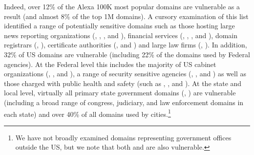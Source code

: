 Indeed, over 12\% of the Alexa 100K
most popular domains are vulnerable as a result (and almost 8\% of the
top 1M domains).  A cursory examination of this list identified a
range of potentially sensitive domains such as those hosting large
news reporting organizations (\eg, ,
,
and ),
financial services (\eg,
, ,
and ),
domain registrars (\eg, ),
certificate authorities (\eg,
 and ) and large law firms (\eg,
).  In addition, 32\% of US  domains are
vulnerable (including 22\% of the domains used by Federal
agencies).  At the Federal level this includes the majority of US
cabinet organizations (\eg, ,  and
), a range of security sensitive agencies (\eg,
,  and ) as well
as those charged with public health and safety (such as
, , and ).
At the state and local
level, virtually all primary state government domains (\eg, )
  are vulnerable (including a broad range of congress, judiciary,
  and law enforcement domains in each state) and over 40\% of all 
  domains used by cities.\footnote{We have not broadly examined domains representing government offices outside the US, but we note that both  and  are also vulnerable.}




